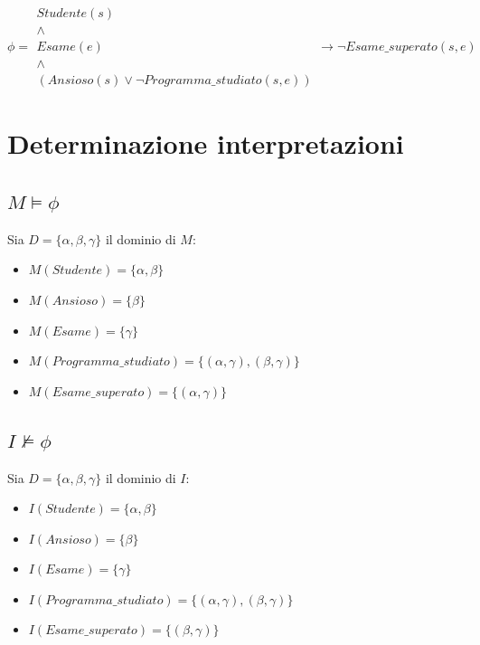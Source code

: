 \documentclass[a4paper, 12pt]{article}
\begin{document}
\[
\phi =
\begin{array}{c}
Studente(s) \\
\land \\
Esame(e) \\
\land \\
(Ansioso(s) \lor \lnot Programma\_studiato(s,e))
\end{array}
\rightarrow
\lnot Esame\_superato(s,e)
\]

\section{Determinazione interpretazioni}
\subsection{$ M \models \phi $}

Sia $D = \{\alpha, \beta, \gamma \}$ il dominio di $M$:
\begin{itemize}[label=-]
    \item $ M(Studente) = \{ \alpha, \beta \} $
    \item $ M(Ansioso) = \{ \beta \} $
    \item $ M(Esame) = \{ \gamma \} $
    \item $ M(Programma\_studiato)=\{ (\alpha, \gamma),( \beta, \gamma) \} $
    \item $ M(Esame\_superato) = \{ (\alpha, \gamma) \}$
\end{itemize}

\subsection{$ I \not \models \phi$}
Sia $D = \{\alpha, \beta, \gamma \}$ il dominio di $I$:
\begin{itemize}[label=-]
    \item $ I(Studente) = \{ \alpha, \beta \} $
    \item $ I(Ansioso) = \{ \beta \} $
    \item $ I(Esame) = \{ \gamma \} $
    \item $ I(Programma\_studiato)=\{ (\alpha, \gamma),( \beta, \gamma) \} $
    \item $ I(Esame\_superato) = \{ (\beta, \gamma) \}$
\end{itemize}
\end{document}
